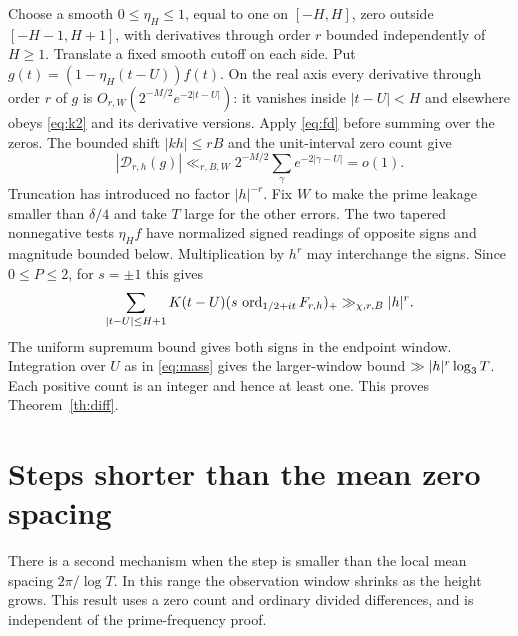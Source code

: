 Choose a smooth $0\le\eta_H\le1$, equal to one on $[-H,H]$, zero outside
$[-H-1,H+1]$, with derivatives through order $r$ bounded independently
of $H\ge1$. Translate a fixed smooth cutoff on each side.
Put $g(t)=(1-\eta_H(t-U))f(t)$. On the real axis every derivative
through order $r$ of $g$ is $O_{r,W}(2^{-M/2}e^{-2|t-U|})$:
it vanishes inside $|t-U|<H$ and elsewhere obeys \eqref{eq:k2} and
its derivative versions. Apply \eqref{eq:fd} before summing over the zeros.
The bounded shift $|kh|\le rB$ and the unit-interval zero count give
\[
 |\mathcal D_{r,h}(g)|\ll_{r,B,W}2^{-M/2}
          \sum_\gamma e^{-2|\gamma-U|}=o(1).
\]
Truncation has introduced no factor $|h|^{-r}$. Fix $W$ to make the prime
leakage smaller than $\delta/4$ and take $T$ large for the other errors.
The two tapered nonnegative tests $\eta_H f$ have normalized signed
readings of opposite signs and magnitude bounded below. Multiplication by
$h^r$ may interchange the signs. Since $0\le P\le2$, for $s=\pm1$ this gives
\[
 \sum_{|t-U|\le H+1}K(t-U)(s\,\operatorname{ord}_{1/2+it}F_{r,h})_+
               \gg_{\chi,r,B}|h|^r .
\]
The uniform supremum bound gives both signs in the endpoint window.
Integration over $U$ as in \eqref{eq:mass} gives the larger-window bound
$\gg |h|^r\log_3 T$. Each positive count is an integer and hence at least
one. This proves Theorem~\ref{th:diff}.

\section{Steps shorter than the mean zero spacing}

There is a second mechanism when the step is smaller than the local
mean spacing $2\pi/\log T$. In this range the observation window shrinks
as the height grows. This result uses a zero count and ordinary divided
differences, and is independent of the prime-frequency proof.

